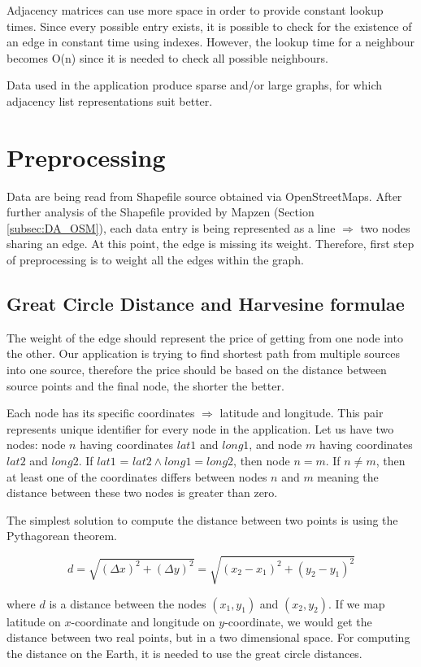\documentclass[thesis=M,english]{FITthesis}[2012/10/20]
\begin{document}
Adjacency matrices can use more space in order to provide constant lookup times. Since every possible entry exists, it is possible to check for the existence of an edge in constant time using indexes. However, the lookup time for a neighbour becomes O(n) since it is needed to check all possible neighbours.

Data used in the application produce sparse and/or large graphs, for which adjacency list representations suit better.



\section{Preprocessing}
\label{sec:preprocessing}
Data are being read from Shapefile source obtained via OpenStreetMaps. After further analysis of the Shapefile provided by Mapzen (Section \ref{subsec:DA_OSM}), each data entry is being represented as a line $\Rightarrow$ two nodes sharing an edge. At this point, the edge is missing its weight. Therefore, first step of preprocessing is to weight all the edges within the graph.

\subsection{Great Circle Distance and Harvesine formulae}
\label{subsec:GCD}
The weight of the edge should represent the price of getting from one node into the other. Our application is trying to find shortest path from multiple sources into one source, therefore the price should be based on the distance between source points and the final node, the shorter the better. 

Each node has its specific coordinates $\Rightarrow$ latitude and longitude. This pair represents unique identifier for every node in the application. Let us have two nodes: node $n$ having coordinates $lat1$ and $long1$, and node $m$ having coordinates $lat2$ and $long2$. If $lat1$ = $lat2 \wedge long1 = long2$, then node $n = m$. If $n \neq m$, then at least one of the coordinates differs between nodes $n$ and $m$ meaning the distance between these two nodes is greater than zero.

The simplest solution to compute the distance between two points is using the Pythagorean theorem.

$$
d = \sqrt{(\Delta x)^2 + (\Delta y)^2} = \sqrt{(x_2 - x_1 )^2 + (y_2 - y_1)^2}
$$

where $d$ is a distance between the nodes $(x_1, y_1)$ and $(x_2, y_2)$. If we map latitude on $x$-coordinate and longitude on $y$-coordinate, we would get the distance between two real points, but in a two dimensional space. For computing the distance on the Earth, it is needed to use the great circle distances.
\end{document}

